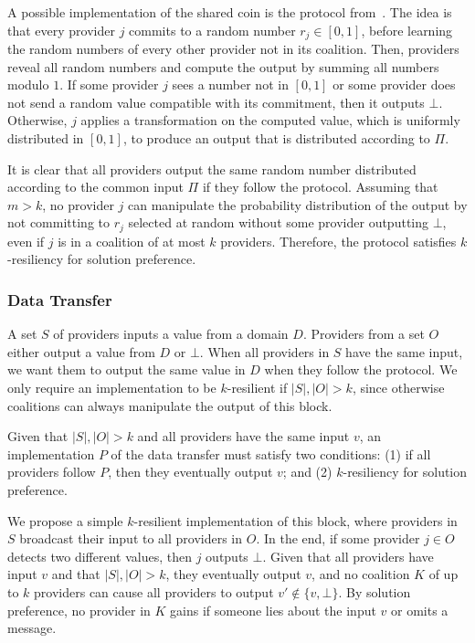A possible implementation of the shared coin is the protocol from~\cite{Abraham:13}.
The idea is that every provider $j$ commits to a random number $r_j \in [0,1]$,
before learning the random numbers of every other provider not in its coalition.
Then, providers reveal all random numbers and compute the output by summing all numbers modulo $1$.
If some provider $j$ sees a number not in $[0,1]$ or some provider does not send
a random value compatible with its commitment, then it outputs $\bot$.
Otherwise, $j$ applies a transformation on the computed value, which is uniformly distributed in $[0,1]$,
to produce an output that is distributed according to $\Pi$.

It is clear that all providers output the same random number distributed according to the common input $\Pi$
if they follow the protocol. Assuming that $m > k$, no provider $j$ can manipulate
the probability distribution of the output by not committing to $r_j$ selected at random
without some provider outputting $\bot$, even if $j$ is in a coalition of at most $k$ providers.
Therefore, the protocol satisfies $k$-resiliency for solution preference.

\subsubsection*{Data Transfer} A set $S$ of providers inputs a value from a domain $D$.
Providers from a set $O$ either output a value from $D$ or $\bot$.
When all providers in $S$ have the same input,
we want them to output the same value in $D$ when they follow the protocol.
We only require an implementation to be $k$-resilient if $|S|,|O| > k$,
since otherwise coalitions can always manipulate the output of this block.

\begin{property}
\label{prop:data-transfer}
Given that $|S|,|O| > k$ and all providers have the same input $v$,
an implementation $P$ of the data transfer must satisfy two conditions: 
(1) if all providers follow $P$, then they eventually output $v$;
and (2) $k$-resiliency for solution preference.
\end{property}

We propose a simple $k$-resilient implementation of this block,
where providers in $S$ broadcast their input to all providers in $O$.
In the end, if some provider $j \in O$ detects two different values,
then $j$ outputs $\bot$. Given that all providers
have input $v$ and that $|S|,|O| > k$,
they eventually output $v$, and
no coalition $K$ of up to $k$ providers
can cause all providers to output $v' \notin \{v,\bot\}$.
By solution preference, no provider in $K$ gains if someone lies
about the input $v$ or omits a message.

